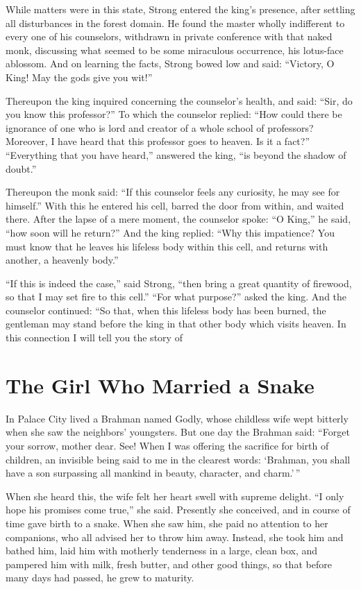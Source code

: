 \documentclass[article, twoside, 14pt]{memoir}
\begin{document}
While matters were in this state, Strong entered the king's
presence, after settling all disturbances in the forest
domain. He found the master wholly indifferent to every one of his
counselors, withdrawn in private conference with that naked monk,
discussing what seemed to be some miraculous occurrence, his
lotus-face ablossom. And on learning the facts, Strong bowed low
and said: ``Victory, O King! May the gods give you wit!''

Thereupon the king inquired concerning the counselor's health, and
said: ``Sir, do you know this professor?'' To which the counselor
replied:
``How could there be ignorance of one who is lord and creator of a whole school of professors? Moreover, I have heard that this professor goes to heaven. Is it a fact?''
``Everything that you have heard,'' answered the king,
``is beyond the shadow of doubt.''

Thereupon the monk said:
``If this counselor feels any curiosity, he may see for himself.''
With this he entered his cell, barred the door from within, and
waited there. After the lapse of a mere moment, the counselor
spoke: ``O King,'' he said, ``how soon will he return?'' And the
king replied:
``Why this impatience? You must know that he leaves his lifeless body within this cell, and returns with another, a heavenly body.''

``If this is indeed the case,'' said Strong,
``then bring a great quantity of firewood, so that I may set fire to this cell.''
``For what purpose?'' asked the king. And the counselor continued:
“So that, when this lifeless body has been burned, the gentleman
may stand before the king in that other body which visits heaven.
In this connection I will tell you the story of

\chapter{The Girl Who Married a Snake}

\label{s26}

In Palace City lived a Brahman named Godly, whose childless wife
wept bitterly when she saw the neighbors' youngsters. But one day
the Brahman said:
``Forget your sorrow, mother dear. See! When I was offering the sacrifice for birth of children, an invisible being said to me in the clearest words: `Brahman, you shall have a son surpassing all mankind in beauty, character, and charm.'\,''

When she heard this, the wife felt her heart swell with
supreme delight. ``I only hope his promises come true,'' she said.
Presently she conceived, and in course of time gave birth to a
snake. When she saw him, she paid no attention to her companions,
who all advised her to throw him away. Instead, she took him and
bathed him, laid him with motherly tenderness in a large, clean
box, and pampered him with milk, fresh butter, and other good
things, so that before many days had passed, he grew to maturity.
\end{document}
